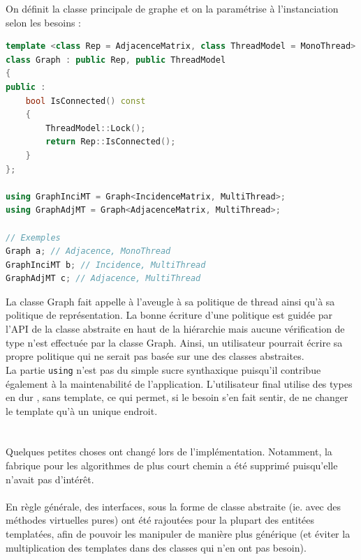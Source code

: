 On définit la classe principale de graphe et on la paramétrise à l'instanciation selon les besoins :
\begin{lstlisting}[label=policy_3,caption=Illustration de la paramétrisation,language=C++]
template <class Rep = AdjacenceMatrix, class ThreadModel = MonoThread>
class Graph : public Rep, public ThreadModel
{
public :
    bool IsConnected() const
    {
        ThreadModel::Lock();
        return Rep::IsConnected();
    }
};

using GraphInciMT = Graph<IncidenceMatrix, MultiThread>;
using GraphAdjMT = Graph<AdjacenceMatrix, MultiThread>;

// Exemples
Graph a; // Adjacence, MonoThread
GraphInciMT b; // Incidence, MultiThread
GraphAdjMT c; // Adjacence, MultiThread

\end{lstlisting}

La classe Graph fait appelle à l'aveugle à sa politique de thread ainsi qu'à sa politique de représentation. La bonne écriture d'une politique est guidée par l'API de la classe abstraite en haut de la hiérarchie mais aucune vérification de type n'est effectuée par la classe Graph. Ainsi, un utilisateur pourrait écrire sa propre politique qui ne serait pas basée sur une des classes abstraites.\\
La partie \verb|using| n'est pas du simple sucre synthaxique puisqu'il contribue également à la maintenabilité de l'application. L'utilisateur final utilise des types en \og{} dur \fg, sans template, ce qui permet, si le besoin s'en fait sentir, de ne changer le template qu'à un unique endroit.

\section{{\color{blue}{Notes sur la modélisation}}}

Quelques petites choses ont changé lors de l'implémentation. Notamment, la fabrique pour les algorithmes de plus court chemin a été supprimé puisqu'elle n'avait pas d'intérêt.\\\\

En règle générale, des interfaces, sous la forme de classe abstraite (ie. avec des méthodes virtuelles pures) ont été rajoutées pour la plupart des entitées templatées, afin de pouvoir les manipuler de manière plus générique (et éviter la multiplication des templates dans des classes qui n'en ont pas besoin).\\\\

